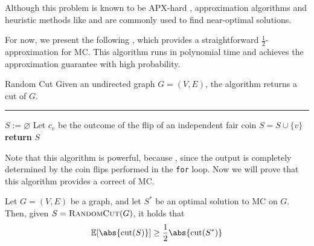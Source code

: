 \documentclass[a4paper, 12pt]{report}
\begin{document}
    Although this problem is known to be \textsf{APX}-hard \cite{maxcut}, approximation algorithms and heuristic methods like  and  are commonly used to find near-optimal solutions.

    For now, we present the following , which provides a straightforward $\frac{1}{2}$-approximation for MC. This algorithm runs in polynomial time and achieves the approximation guarantee with high probability.

    \begin{framedalgo}[label={max cut alg}]{Random Cut}
        Given an undirected graph $G = (V, E)$, the algorithm returns a cut of $G$. \\
        \hrule

        \quad
        \begin{algorithmic}[1]
                \State $S := \varnothing$
                    \State Let $c_v$ be the outcome of the flip of an independent fair coin
                        \State $S = S \cup \{v\}$
                    \EndIf
                \EndFor
                \State \textbf{return} $S$
            \EndFunction
        \end{algorithmic}
    \end{framedalgo}

    Note that this algorithm is powerful, because , since the output is completely determined by the coin flips performed in the \texttt{for} loop. Now we will prove that this algorithm provides a correct  of MC.
    
    \begin{framedthm}[label={expected random cut}]{}
        Let $G= (V, E)$ be a graph, and let $S^*$ be an optimal solution to MC on $G$. Then, given $S = \textsc{RandomCut}(G)$, it holds that $$\mathbb E [\abs{\mathrm{cut}(S)}] \ge \dfrac{1}{2} \abs{\mathrm{cut}(S^*)}$$
    \end{framedthm}
\end{document}
